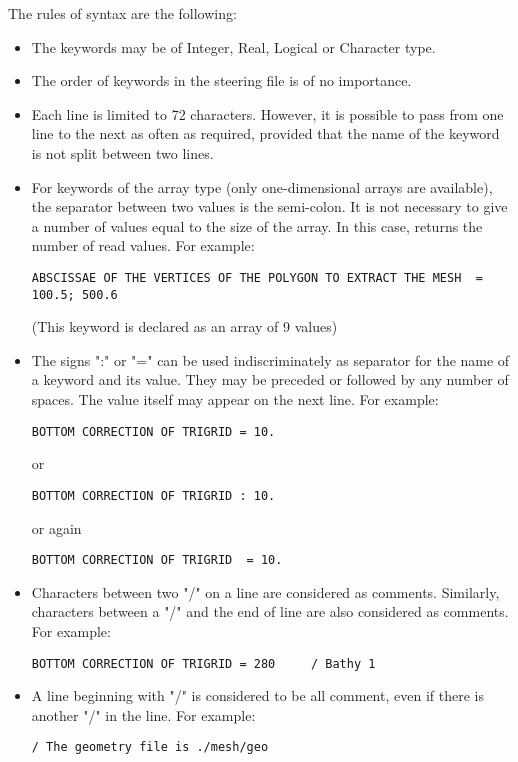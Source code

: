 The rules of syntax are the following:
\begin{itemize}
\item The keywords may be of Integer, Real, Logical or Character type.
\item The order of keywords in the steering file is of no importance.
\item Each line is limited to 72 characters. However, it is possible to pass
from one line to the next as often as required, provided that the name of the
keyword is not split between two lines.
\item For keywords of the array type (only one-dimensional arrays are
available), the separator between two values is the semi-colon. It is not
necessary to give a number of values equal to the size of the array. In this
case, \damo returns the number of read values. For example:
\begin{lstlisting}[language=TelemacCas]
ABSCISSAE OF THE VERTICES OF THE POLYGON TO EXTRACT THE MESH  = 100.5; 500.6
\end{lstlisting}
  (This keyword is declared as an array of 9 values)
\item The signs ":" or "=" can be used indiscriminately as separator for the
name of a keyword and its value. They may be preceded or followed by any number
of spaces. The value itself may appear on the next line. For example:
\begin{lstlisting}[language=TelemacCas]
BOTTOM CORRECTION OF TRIGRID = 10.
\end{lstlisting}
or
\begin{lstlisting}[language=TelemacCas]
BOTTOM CORRECTION OF TRIGRID : 10.
\end{lstlisting}
or again
\begin{lstlisting}[language=TelemacCas]
BOTTOM CORRECTION OF TRIGRID  = 10.
\end{lstlisting}
\item Characters between two "/" on a line are considered as comments.
Similarly, characters between a "/" and the end of line are also considered as
comments. For example:
\begin{lstlisting}[language=TelemacCas]
BOTTOM CORRECTION OF TRIGRID = 280     / Bathy 1
\end{lstlisting}
\item A line beginning with "/" is considered to be all comment, even if there
is another "/" in the line. For example:
\begin{lstlisting}[language=TelemacCas]
      / The geometry file is ./mesh/geo

\end{lstlisting}
\end{itemize}

